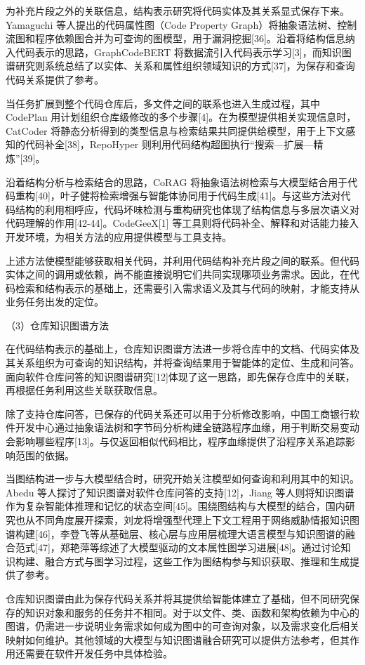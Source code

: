 为补充片段之外的关联信息，结构表示研究将代码实体及其关系显式保存下来。Yamaguchi 等人提出的代码属性图（Code Property Graph）将抽象语法树、控制流图和程序依赖图合并为可查询的图模型，用于漏洞挖掘[36]。沿着将结构信息纳入代码表示的思路，GraphCodeBERT 将数据流引入代码表示学习[3]，而知识图谱研究则系统总结了以实体、关系和属性组织领域知识的方式[37]，为保存和查询代码关系提供了参考。

当任务扩展到整个代码仓库后，多文件之间的联系也进入生成过程，其中 CodePlan 用计划组织仓库级修改的多个步骤[4]。在为模型提供相关实现信息时，CatCoder 将静态分析得到的类型信息与检索结果共同提供给模型，用于上下文感知的代码补全[38]，RepoHyper 则利用代码结构超图执行“搜索—扩展—精炼”[39]。

沿着结构分析与检索结合的思路，CoRAG 将抽象语法树检索与大模型结合用于代码重构[40]，叶子健将检索增强与智能体协同用于代码生成[41]。与这些方法对代码结构的利用相呼应，代码坏味检测与重构研究也体现了结构信息与多层次语义对代码理解的作用[42-44]。CodeGeeX[1] 等工具则将代码补全、解释和对话能力接入开发环境，为相关方法的应用提供模型与工具支持。

上述方法使模型能够获取相关代码，并利用代码结构补充片段之间的联系。但代码实体之间的调用或依赖，尚不能直接说明它们共同实现哪项业务需求。因此，在代码检索和结构表示的基础上，还需要引入需求语义及其与代码的映射，才能支持从业务任务出发的定位。

（3）仓库知识图谱方法

在代码结构表示的基础上，仓库知识图谱方法进一步将仓库中的文档、代码实体及其关系组织为可查询的知识结构，并将查询结果用于智能体的定位、生成和问答。面向软件仓库问答的知识图谱研究[12]体现了这一思路，即先保存仓库中的关联，再根据任务利用这些关联获取信息。

除了支持仓库问答，已保存的代码关系还可以用于分析修改影响，中国工商银行软件开发中心通过抽象语法树和字节码分析构建全链路程序血缘，用于判断交易变动会影响哪些程序[13]。与仅返回相似代码相比，程序血缘提供了沿程序关系追踪影响范围的依据。

当图结构进一步与大模型结合时，研究开始关注模型如何查询和利用其中的知识。Abedu 等人探讨了知识图谱对软件仓库问答的支持[12]，Jiang 等人则将知识图谱作为复杂智能体推理和记忆的状态空间[45]。围绕图结构与大模型的结合，国内研究也从不同角度展开探索，刘龙将增强型代理上下文工程用于网络威胁情报知识图谱构建[46]，李登飞等从基础层、核心层与应用层梳理大语言模型与知识图谱的融合范式[47]，郑艳萍等综述了大模型驱动的文本属性图学习进展[48]。通过讨论知识构建、融合方式与图学习过程，这些工作为图结构参与知识获取、推理和生成提供了参考。

仓库知识图谱由此为保存代码关系并将其提供给智能体建立了基础，但不同研究保存的知识对象和服务的任务并不相同。对于以文件、类、函数和架构依赖为中心的图谱，仍需进一步说明业务需求如何成为图中的可查询对象，以及需求变化后相关映射如何维护。其他领域的大模型与知识图谱融合研究可以提供方法参考，但其作用还需要在软件开发任务中具体检验。



